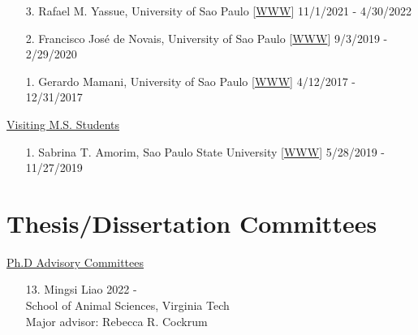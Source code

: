 \documentclass[margin,line,10pt]{res}
\begin{document}
\begin{resume}
\begin{enumerate}
  \vspace{0.3cm}

\item [3.] Rafael M. Yassue, University of Sao Paulo [\textcolor{blue}{\href{https://rafaelyassue.github.io/cv-online/}{WWW}}]  \hfill  11/1/2021 - 4/30/2022

    \vspace{0.3cm}

\item [2.] Francisco Jos\'{e} de Novais,  University of Sao Paulo [\textcolor{blue}{\href{https://fjnovais.github.io/}{WWW}}]  \hfill  9/3/2019 - 2/29/2020

\vspace{0.3cm}

\item [1.] Gerardo Mamani, University of Sao Paulo  [\textcolor{blue}{\href{https://github.com/gerardocorn}{WWW}}]  \hfill 4/12/2017 - 12/31/2017
\end{enumerate}



\begin{flushleft}
\hspace{0.2cm} \underline{Visiting M.S. Students}
\end{flushleft}
\begin{enumerate}
\item [1.] Sabrina T. Amorim, Sao Paulo State University [\textcolor{blue}{\href{https://sabrinaam.github.io/}{WWW}}]  \hfill 5/28/2019 - 11/27/2019
\end{enumerate}


\vspace{0.5cm}
\section{\sc Thesis/Dissertation Committees}

\begin{flushleft}
\hspace{0.2cm} \underline{Ph.D Advisory Committees}
\end{flushleft}
\begin{enumerate}




  \item [13.] Mingsi Liao \hfill 2022 - \\
  School of Animal Sciences,  Virginia Tech \\ 
  Major advisor: Rebecca R. Cockrum 

  \vspace{0.3cm}


\end{enumerate}
\end{resume}
\end{document}
